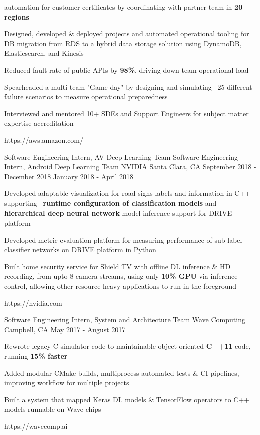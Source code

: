 \begin{cventries}
{\begin{cvitems}
{    automation for customer certificates by coordinating with partner team in \textbf{20 regions}}
\item{Designed, developed \& deployed projects and automated operational tooling for
    DB migration from RDS to a hybrid data storage solution using DynamoDB, Elasticsearch,
    and Kinesis}
\item{Reduced fault rate of public APIs by \textbf{98\%}, driving down team operational
    load}
\item{Spearheaded a multi-team "Game day" by designing and simulating ~25 different failure
    scenarios to measure operational preparedness}
\item{Interviewed and mentored 10+ SDEs and Support Engineers for subject matter
    expertise accreditation}
\end{cvitems}
}
{https://aws.amazon.com/}


\cventrylink
{Software Engineering Intern, AV Deep Learning Team \newline {\vspace{-.75mm}}
    Software Engineering Intern, Android Deep Learning Team}
{NVIDIA}
{Santa Clara, CA}
{September 2018 - December 2018 \newline {\vspace{-1mm}}
    January 2018 - April 2018}
{ %
\begin{cvitems}
\item{Developed adaptable visualization for road signs labels and information in C++ supporting \
    \textbf{runtime configuration of classification models} and \textbf{hierarchical deep neural network}
    model inference support for DRIVE platform}
\item{Developed metric evaluation platform for measuring performance of sub-label classifier networks on DRIVE platform
    in Python}
\item{Built home security service for Shield TV with offline DL inference \& HD recording, from upto 8 camera streams,
    using only \textbf{10\% GPU} via inference control, allowing other resource-heavy applications to run in the foreground}
\end{cvitems}
}
{https://nvidia.com}


\cventrylink
    {Software Engineering Intern, System and Architecture Team}
{Wave Computing}
{Campbell, CA}
    {May 2017 - August 2017}
{ %
\begin{cvitems}
\item {Rewrote legacy C simulator code to maintainable object-oriented \textbf{C++11} code, running \textbf{15\% faster}}
\item {Added modular CMake builds, multiprocess automated tests \& CI pipelines, improving workflow for multiple projects}
\item {Built a system that mapped Keras DL models \& TensorFlow operators to C++ models runnable on Wave chips}
\end{cvitems}
}
{https://wavecomp.ai}


\end{cventries}
